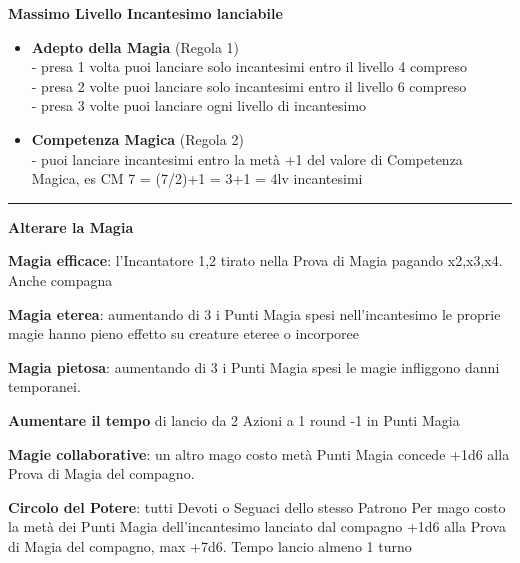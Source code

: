\documentclass[a4paper,12 pt,openany]{book}
\newcommand{\riga}{\rule{\textwidth}{0.4pt}}
\begin{document}
\begin{textblock*}{13.5cm}
\textbf{Massimo Livello Incantesimo lanciabile}

\begin{itemize}
	\item
	\textbf{Adepto della Magia} (Regola 1) \\
	- presa 1 volta puoi lanciare solo incantesimi entro il livello 4 compreso\\
	- presa 2 volte puoi lanciare solo incantesimi entro il livello 6 compreso\\
	- presa 3 volte puoi lanciare ogni livello di incantesimo

	\item
	\textbf{Competenza Magica} (Regola 2)\\
	- puoi lanciare incantesimi entro la metà +1 del valore di Competenza Magica, es CM 7 = (7/2)+1 = 3+1 = 4lv incantesimi

\end{itemize}

\riga

\textbf{Alterare la Magia}

\textbf{Magia efficace}: l'Incantatore 1,2 tirato nella Prova di Magia pagando x2,x3,x4. Anche compagna

\textbf{Magia eterea}: aumentando di 3 i Punti Magia spesi nell'incantesimo le proprie magie hanno pieno effetto su creature eteree o incorporee

\textbf{Magia pietosa}: aumentando di 3 i Punti Magia spesi le magie infliggono danni temporanei.

\textbf{Aumentare il tempo} di lancio da 2 Azioni a 1 round -1 in Punti Magia

\textbf{Magie collaborative}: un altro mago costo metà Punti Magia concede +1d6 alla Prova di Magia del compagno.

\textbf{Circolo del Potere}: tutti Devoti o Seguaci dello stesso Patrono
Per mago costo la metà dei Punti Magia dell'incantesimo lanciato dal compagno +1d6 alla Prova di Magia del compagno, max +7d6. Tempo lancio almeno 1 turno
\end{textblock*}

~\newpage
\end{document}
